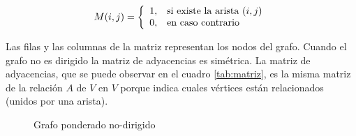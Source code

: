         \begin{displaymath}
          M(i,j) = \left\{
          \begin{array}{ l l }
            1, & \textrm{si existe la arista } (i,j) \\
            0, & \textrm{en caso contrario}
          \end{array} \right.
        \end{displaymath}


        Las filas y las columnas de la matriz representan los nodos del grafo.
        Cuando el grafo no es dirigido la matriz de adyacencias es simétrica.
        La matriz de adyacencias, que se puede observar en el cuadro \ref{tab:matriz}, es la  misma matriz de la relación $A$ de $V$ en $V$ porque indica cuales v\'ertices están relacionados (unidos por una arista).



        \begin{figure}[!ht]
          \begin{center}
            \caption{Grafo ponderado no-dirigido}
            \label{fig:grafo_ponderado}


          \end{center}
        \end{figure}


